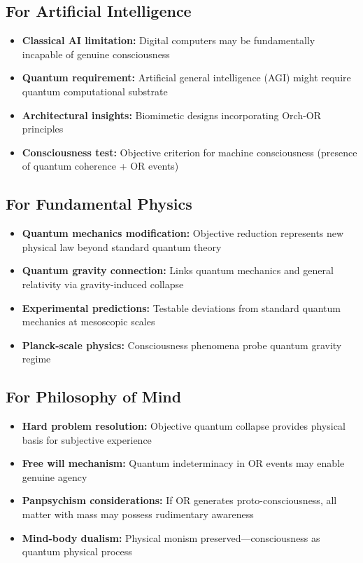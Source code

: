 \subsection{For Artificial Intelligence}

\begin{itemize}
\item \textbf{Classical AI limitation:} Digital computers may be fundamentally incapable of genuine consciousness
\item \textbf{Quantum requirement:} Artificial general intelligence (AGI) might require quantum computational substrate
\item \textbf{Architectural insights:} Biomimetic designs incorporating Orch-OR principles
\item \textbf{Consciousness test:} Objective criterion for machine consciousness (presence of quantum coherence + OR events)
\end{itemize}

\subsection{For Fundamental Physics}

\begin{itemize}
\item \textbf{Quantum mechanics modification:} Objective reduction represents new physical law beyond standard quantum theory
\item \textbf{Quantum gravity connection:} Links quantum mechanics and general relativity via gravity-induced collapse
\item \textbf{Experimental predictions:} Testable deviations from standard quantum mechanics at mesoscopic scales
\item \textbf{Planck-scale physics:} Consciousness phenomena probe quantum gravity regime
\end{itemize}

\subsection{For Philosophy of Mind}

\begin{itemize}
\item \textbf{Hard problem resolution:} Objective quantum collapse provides physical basis for subjective experience
\item \textbf{Free will mechanism:} Quantum indeterminacy in OR events may enable genuine agency
\item \textbf{Panpsychism considerations:} If OR generates proto-consciousness, all matter with mass may possess rudimentary awareness
\item \textbf{Mind-body dualism:} Physical monism preserved---consciousness as quantum physical process
\end{itemize}

